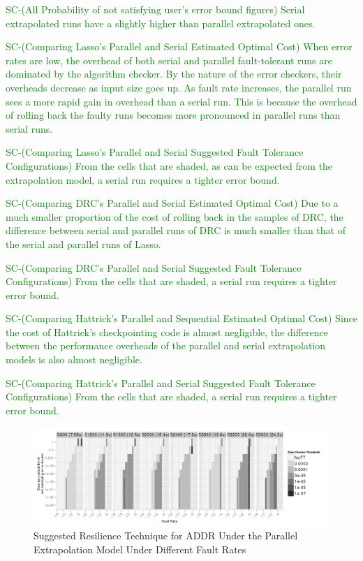 \documentclass[10pt, conference, compsocconf]{IEEEtran}
\newcommand{\sui}[1]{%
  \textcolor{green}{SC-#1}
}
\begin{document}
\sui{(All Probability of not satisfying user's error bound figures)
Serial extrapolated runs have a slightly higher than parallel extrapolated ones.}

\sui{(Comparing Lasso's Parallel and Serial Estimated Optimal Cost)
When error rates are low, the overhead of both serial and parallel fault-tolerant runs are dominated by the algorithm checker. By the nature of the error checkers, their overheads decrease as input size goes up.
As fault rate increases, the parallel run sees a more rapid gain in overhead than a serial run. This is because the overhead of rolling back the faulty runs becomes more pronounced in parallel runs than serial runs.}

\sui{(Comparing Lasso's Parallel and Serial Suggested Fault Tolerance Configurations)
From the cells that are shaded, as can be expected from the extrapolation model, a serial run requires a tighter error bound. }

\sui{(Comparing DRC's Parallel and Serial Estimated Optimal Cost)
Due to a much smaller proportion of the cost of rolling back in the samples of DRC, the difference between serial and parallel runs of DRC is much smaller than that of the serial and parallel runs of Lasso.}

\sui{(Comparing DRC's Parallel and Serial Suggested Fault Tolerance Configurations)
From the cells that are shaded, a serial run requires a tighter error bound.}

\sui{(Comparing Hattrick's Parallel and Sequential Estimated Optimal Cost)
Since the cost of Hattrick's checkpointing code is almost negligible, the difference between the performance overheads of the parallel and serial extrapolation models is also almost negligible.}

\sui{(Comparing Hattrick's Parallel and Serial Suggested Fault Tolerance Configurations)
From the cells that are shaded, a serial run requires a tighter error bound.}

\begin{figure}[ht!]
\centering
\includegraphics[width=7in]{figs/Lasso_Parallel_SuggestedConf.png}
\vspace{-10pt}
\caption{Suggested Resilience Technique for ADDR Under the Parallel Extrapolation Model Under Different Fault Rates}
\vspace{-10pt}
\label{fig:Lasso_Parallel_SuggestedConf}
\end{figure}
\end{document}
